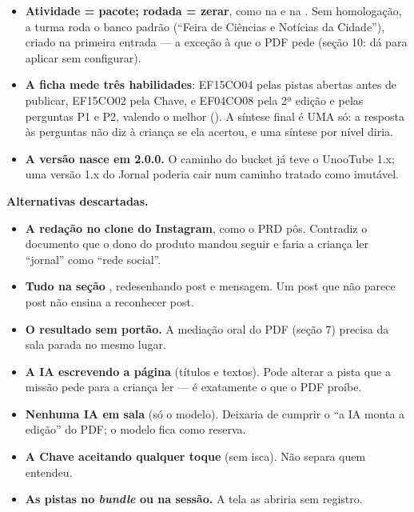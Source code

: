 \begin{itemize}
    três iscas (\enquote{foto}, \enquote{urgência}, \enquote{compartilhada}); a
    isca volta para a bandeja, e o nível sai do número de tentativas. Sem isca, a
    EF15CO02 daria \enquote{atingiu} para toda criança que tocasse três blocos.
  \item \textbf{Atividade = pacote; rodada = zerar}, como na  e na
    . Sem homologação, a turma roda o banco padrão (\enquote{Feira de
    Ciências e Notícias da Cidade}), criado na primeira entrada --- a exceção à
     que o PDF pede (seção 10: dá para aplicar sem configurar).
  \item \textbf{A ficha mede três habilidades}: EF15CO04 pelas pistas abertas antes
    de publicar, EF15CO02 pela Chave, e EF04CO08 pela 2ª edição e pelas perguntas
    P1 e P2, valendo o melhor (). A síntese final é UMA só: a
    resposta às perguntas não diz à criança se ela acertou, e uma síntese por
    nível diria.
  \item \textbf{A versão nasce em 2.0.0.} O caminho  do bucket já teve
    o UnooTube 1.x; uma versão 1.x do Jornal poderia cair num caminho tratado como
    imutável.
\end{itemize}

\textbf{Alternativas descartadas.}

\begin{itemize}
  \item \textbf{A redação no clone do Instagram}, como o PRD pôs. Contradiz o
    documento que o dono do produto mandou seguir e faria a criança ler
    \enquote{jornal} como \enquote{rede social}.
  \item \textbf{Tudo na seção }, redesenhando post e mensagem. Um post
    que não parece post não ensina a reconhecer post.
  \item \textbf{O resultado sem portão.} A mediação oral do PDF (seção 7) precisa
    da sala parada no mesmo lugar.
  \item \textbf{A IA escrevendo a página} (títulos e textos). Pode alterar a pista
    que a missão pede para a criança ler --- é exatamente o que o PDF proíbe.
  \item \textbf{Nenhuma IA em sala} (só o modelo). Deixaria de cumprir o
    \enquote{a IA monta a edição} do PDF; o modelo fica como reserva.
  \item \textbf{A Chave aceitando qualquer toque} (sem isca). Não separa quem
    entendeu.
  \item \textbf{As pistas no \emph{bundle} ou na sessão.} A tela as abriria sem
    registro.
\end{itemize}

